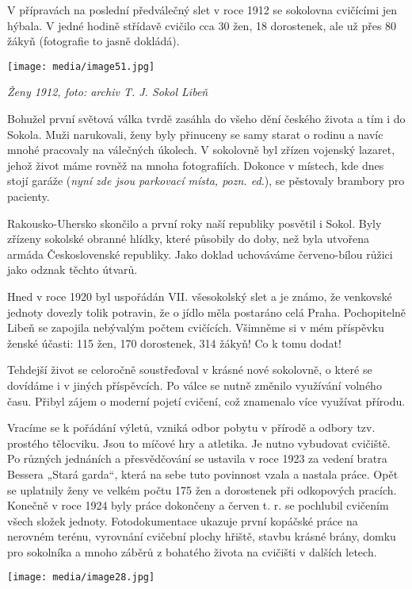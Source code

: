 V přípravách na poslední předválečný slet v roce 1912 se sokolovna
cvičícími jen hýbala. V jedné hodině střídavě cvičilo cca 30 žen, 18
dorostenek, ale už přes 80 žákyň (fotografie to jasně dokládá).

\texttt{[image: media/image51.jpg]}

\emph{Ženy 1912, foto: archiv T. J. Sokol Libeň}

Bohužel první světová válka tvrdě zasáhla do všeho dění českého života a
tím i do Sokola. Muži narukovali, ženy byly přinuceny se samy starat o
rodinu a navíc mnohé pracovaly na válečných úkolech. V sokolovně byl
zřízen vojenský lazaret, jehož život máme rovněž na mnoha fotografiích.
Dokonce v místech, kde dnes stojí garáže (\emph{nyní zde jsou parkovací
místa, pozn. ed.}), se pěstovaly brambory pro pacienty.

Rakousko-Uhersko skončilo a první roky naší republiky posvětil i Sokol.
Byly zřízeny sokolské obranné hlídky, které působily do doby, než byla
utvořena armáda Československé republiky. Jako doklad uchováváme
červeno-bílou růžici jako odznak těchto útvarů.

Hned v roce 1920 byl uspořádán VII. všesokolský slet a je známo, že
venkovské jednoty dovezly tolik potravin, že o jídlo měla postaráno celá
Praha. Pochopitelně Libeň se zapojila nebývalým počtem cvičících.
Všimněme si v mém příspěvku ženské účasti: 115 žen, 170 dorostenek, 314
žákyň! Co k tomu dodat!

Tehdejší život se celoročně soustřeďoval v krásné nové sokolovně, o
které se dovídáme i v jiných příspěvcích. Po válce se nutně změnilo
využívání volného času. Přibyl zájem o moderní pojetí cvičení, což
znamenalo více využívat přírodu.

Vracíme se k pořádání výletů, vzniká odbor pobytu v přírodě a odbory
tzv. prostého tělocviku. Jsou to míčové hry a atletika. Je nutno
vybudovat cvičiště. Po různých jednáních a přesvědčování se ustavila v
roce 1923 za vedení bratra Bessera „Stará garda``, která na sebe tuto
povinnost vzala a nastala práce. Opět se uplatnily ženy ve velkém počtu
175 žen a dorostenek při odkopových pracích. Konečně v roce 1924 byly
práce dokončeny a červen t. r. se pochlubil cvičením všech složek
jednoty. Fotodokumentace ukazuje první kopáčské práce na nerovném
terénu, vyrovnání cvičební plochy hřiště, stavbu krásné brány, domku pro
sokolníka a mnoho záběrů z bohatého života na cvičišti v dalších letech.

\texttt{[image: media/image28.jpg]}

